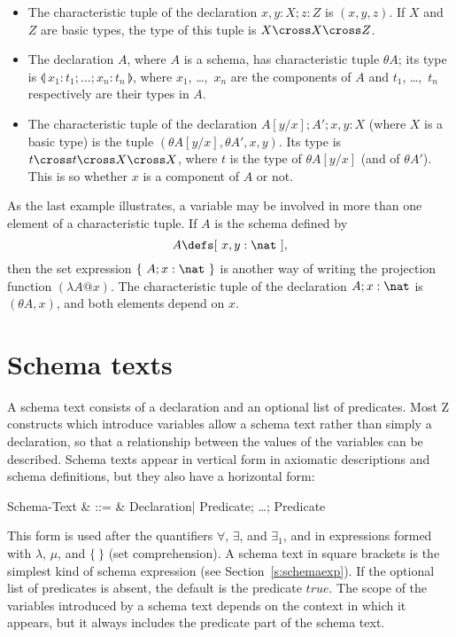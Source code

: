 \begin{itemize}
\item The characteristic tuple of the declaration $x, y: X; z: Z$
        is $(x, y, z)$. If $X$ and $Z$ are basic types, the
        type of this tuple is $X \cross X \cross Z$.

\item The declaration $A$, where $A$ is a schema, has characteristic
        tuple $\theta A$; its type is
        $\lblot~x_1: t_1; \ldots; x_n: t_n~\rblot$,
        where $x_1$, \dots,~$x_n$ are the components of $A$ and
        $t_1$, \dots,~$t_n$ respectively are their types in $A$.

\item The characteristic tuple of the declaration $A[y/x]; A'; x, y: X$
	(where $X$ is a basic type) is the tuple $(\theta A[y/x], \theta
	A', x, y)$. Its type is $t \cross t \cross X \cross X$,
	where $t$ is the type of $\theta A[y/x]$ (and of $\theta A'$).
	This is so whether $x$ is a component of $A$ or not.
\end{itemize}
As the last example illustrates, a variable may be involved in more
than one element of a characteristic tuple. If $A$ is the schema
defined by
\[ A \defs [~x,y:\nat~], \]
then the set expression $\{~A; x:\nat~\}$ is another way of writing the
projection function $(\lambda A @ x)$.
The characteristic tuple of the declaration $A; x:\nat$ is 
$(\theta A, x)$, and both elements depend on $x$.

\section{Schema texts}\label{s:schematext}

A schema text consists of a declaration and an
optional list of predicates.
Most Z constructs which introduce variables allow a schema text
rather than simply a declaration, so that a relationship between
the values of the variables can be described. Schema texts appear
in vertical form in axiomatic descriptions and schema definitions,
but they also have a horizontal form:
\begin{syntax}
        Schema-Text & ::= &
		Declaration\;\lopt | Predicate; \ldots; Predicate \ropt
\end{syntax}
This form is used after the quantifiers $\forall$, $\exists$,
and $\exists_1$, and in expressions formed with $\lambda$, $\mu$,
and $\{~\}$ (set comprehension).
A schema text in square brackets is the simplest kind of schema expression
(see Section~\ref{s:schemaexp}).
If the optional list of predicates is absent, the default
is the predicate $true$. The scope
of the variables introduced
by a schema text depends on the context in which it appears, but
it always includes the predicate part of the schema text.

